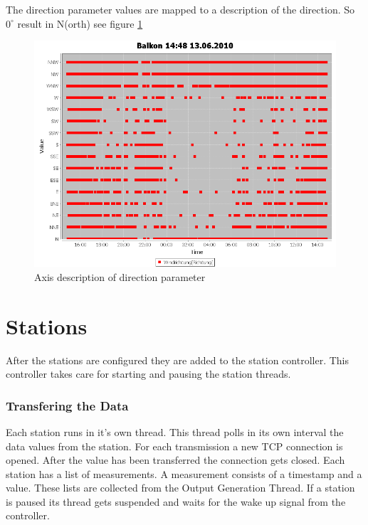 The direction parameter values are mapped to a description of the direction. So $0^\circ$ result in N(orth) see figure \ref{fig:dir}
\begin{figure}[ht]
    \centering
    \includegraphics[width=0.9\linewidth]{master/plot_dir.png}
    \caption{Axis description of direction parameter}
    \label{fig:dir}
\end{figure}

\section{Stations} %
\label{sec:stations}

After the stations are configured they are added to the station controller. This controller takes care for starting and pausing the station threads. 

\subsubsection{Transfering the Data} %
\label{ssub:getting_the_data}
Each station runs in it's own thread. This thread polls in its own interval the data values from the station. For each transmission a new TCP connection is opened. After the value has been transferred the connection gets closed. Each station has a list of measurements. A measurement consists of a timestamp and a value. These lists are collected from the Output Generation Thread. If a station is paused its thread gets suspended and waits for the wake up signal from the controller. 

